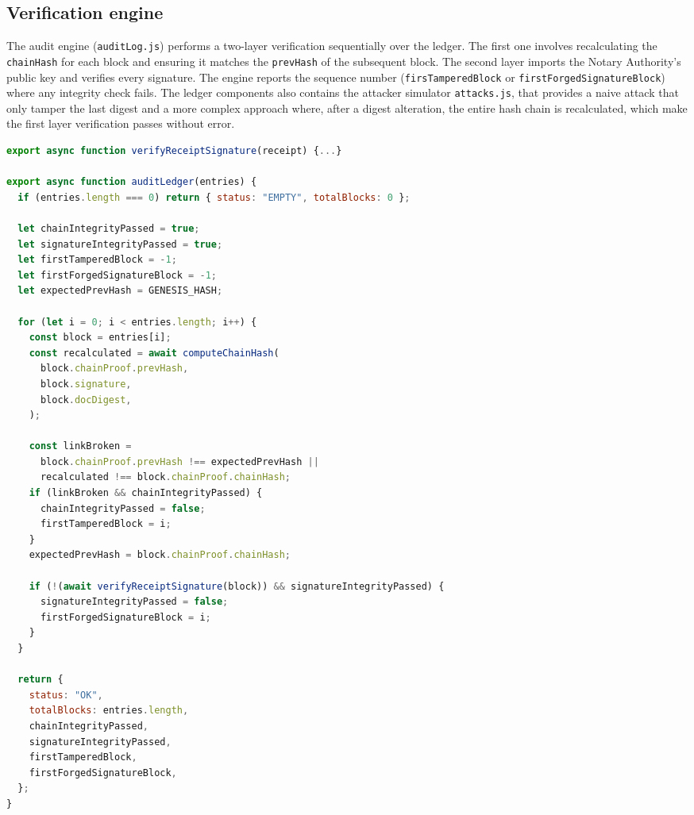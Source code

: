 \documentclass[11pt,a4paper]{article}
\begin{document}
\begin{spacing}{1.1}
\subsection{Verification engine}
The audit engine (\texttt{auditLog.js}) performs a two-layer verification sequentially over the ledger. The first one involves recalculating the \texttt{chainHash} for each block and ensuring it matches the \texttt{prevHash} of the subsequent block. The second layer imports the Notary Authority's public key and verifies every signature. The engine reports the sequence number (\texttt{firsTamperedBlock} or \texttt{firstForgedSignatureBlock}) where any integrity check fails. The ledger components also contains the attacker simulator \texttt{attacks.js}, that provides a naive attack that only tamper the last digest and a more complex approach where, after a digest alteration, the entire hash chain is recalculated, which make the first  layer verification passes without error.

\begin{lstlisting}[language=JavaScript, caption=ledger/auditLog.js]
export async function verifyReceiptSignature(receipt) {...}

export async function auditLedger(entries) {
  if (entries.length === 0) return { status: "EMPTY", totalBlocks: 0 };

  let chainIntegrityPassed = true;
  let signatureIntegrityPassed = true;
  let firstTamperedBlock = -1;
  let firstForgedSignatureBlock = -1;
  let expectedPrevHash = GENESIS_HASH;

  for (let i = 0; i < entries.length; i++) {
    const block = entries[i];
    const recalculated = await computeChainHash(
      block.chainProof.prevHash,
      block.signature,
      block.docDigest,
    );

    const linkBroken =
      block.chainProof.prevHash !== expectedPrevHash ||
      recalculated !== block.chainProof.chainHash;
    if (linkBroken && chainIntegrityPassed) {
      chainIntegrityPassed = false;
      firstTamperedBlock = i;
    }
    expectedPrevHash = block.chainProof.chainHash;

    if (!(await verifyReceiptSignature(block)) && signatureIntegrityPassed) {
      signatureIntegrityPassed = false;
      firstForgedSignatureBlock = i;
    }
  }

  return {
    status: "OK",
    totalBlocks: entries.length,
    chainIntegrityPassed,
    signatureIntegrityPassed,
    firstTamperedBlock,
    firstForgedSignatureBlock,
  };
}


\end{lstlisting}
\end{spacing}
\end{document}
